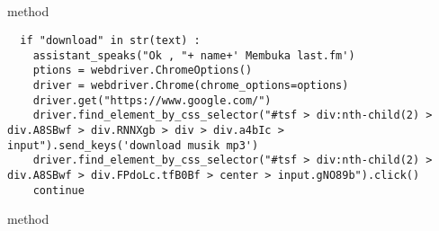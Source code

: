 \\
\\
\\
\\
\\
\\
\\
\\
\\
\\
\\
\\
\\
\\
\\
\\
\\
\\
\\
\\
\\
\\
\\
\\
\\
\\
\\
\\
\\
\\
\\
\\
\\
\\
\\
\\
 method 
\begin{lstlisting}
  if "download" in str(text) :
    assistant_speaks("Ok , "+ name+' Membuka last.fm')
    ptions = webdriver.ChromeOptions()
    driver = webdriver.Chrome(chrome_options=options)
    driver.get("https://www.google.com/")
    driver.find_element_by_css_selector("#tsf > div:nth-child(2) > div.A8SBwf > div.RNNXgb > div > div.a4bIc > input").send_keys('download musik mp3')
    driver.find_element_by_css_selector("#tsf > div:nth-child(2) > div.A8SBwf > div.FPdoLc.tfB0Bf > center > input.gNO89b").click()
    continue
\end{lstlisting}
 method 
\\
\\
\\
\\
\\
\\
\\
\\
\\
\\
